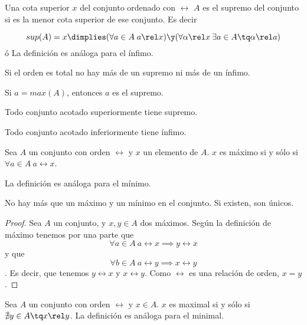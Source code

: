 \documentclass[nochap]{apuntes}
\begin{document}
\begin{defn}
Una cota superior $x$ del conjunto ordenado con $\rel$ $A$ es el supremo del conjunto si es la menor cota superior de ese conjunto. Es decir

\[sup(A)=x \dimplies (\forall a \in A \; a\rel x) \y (\forall  \alpha \rel x\: \exists a \in A \tq \alpha \rel a) \]
ó
La definición es análoga para el ínfimo.
\end{defn}

\begin{prop}
Si el orden es total no hay más de un supremo ni más de un ínfimo.
\end{prop}

\begin{prop}
Si $a = max(A)$, entonces $a$ es el supremo.\end{prop}

\begin{axiom} Todo conjunto acotado superiormente tiene supremo.\end{axiom}
\begin{theorem} Todo conjunto acotado inferiormente tiene ínfimo.\end{theorem}

\begin{defn} Sea $A$ un conjunto con orden $\rel$ y $x$ un elemento de $A$. $x$ es máximo si y sólo si $\forall a \in A \: a\rel x$.

La definición es análoga para el mínimo.
\end{defn}

\begin{prop}No hay más que un máximo y un mínimo en el conjunto. Si existen, son únicos.

\begin{proof}
Sea $A$ un conjunto, y $x, y \in A$ dos máximos. Según la definición de máximo tenemos por una parte que \[ \forall a \in A \: a\rel x \implies y\rel x \] y que \[ \forall b \in A \: a\rel y \implies x\rel y \]. Es decir, que tenemos $y\rel x$ y $x\rel y$. Como $\rel$ es una relación de orden, $x=y$.
\end{proof}

\end{prop}


\begin{defn} Sea $A$ un conjunto con orden $\rel$ y $x\in A$. $x$ es maximal si y sólo si $\nexists y \in A \tq x\rel y$. La definición es análoga para el minimal.\end{defn}
\end{document}
